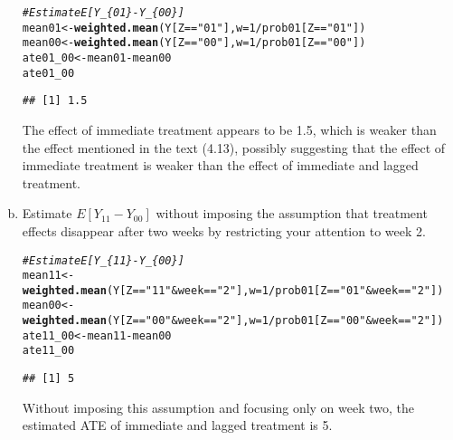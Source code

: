 \documentclass[11pt,notitlepage]{article}\usepackage[]{graphicx}\usepackage[]{color}
\makeatletter
\newcommand{\hlnum}[1]{\textcolor[rgb]{0.686,0.059,0.569}{#1}}%
\newcommand{\hlstr}[1]{\textcolor[rgb]{0.192,0.494,0.8}{#1}}%
\newcommand{\hlcom}[1]{\textcolor[rgb]{0.678,0.584,0.686}{\textit{#1}}}%
\newcommand{\hlopt}[1]{\textcolor[rgb]{0,0,0}{#1}}%
\newcommand{\hlstd}[1]{\textcolor[rgb]{0.345,0.345,0.345}{#1}}%
\newcommand{\hlkwb}[1]{\textcolor[rgb]{0.69,0.353,0.396}{#1}}%
\newcommand{\hlkwc}[1]{\textcolor[rgb]{0.333,0.667,0.333}{#1}}%
\newcommand{\hlkwd}[1]{\textcolor[rgb]{0.737,0.353,0.396}{\textbf{#1}}}%
\newenvironment{kframe}{%
 \def\at@end@of@kframe{}%
 \ifinner\ifhmode%
  \def\at@end@of@kframe{\end{minipage}}%
  \begin{minipage}{\columnwidth}%
 \fi\fi%
 \def\FrameCommand##1{\hskip\@totalleftmargin \hskip-\fboxsep
 \colorbox{shadecolor}{##1}\hskip-\fboxsep
     \hskip-\linewidth \hskip-\@totalleftmargin \hskip\columnwidth}%
 \MakeFramed {\advance\hsize-\width
   \@totalleftmargin\z@ \linewidth\hsize
   \@setminipage}}%
 {\par\unskip\endMakeFramed%
 \at@end@of@kframe}
\newenvironment{knitrout}{}{} %
\makeatother
\begin{document}
\begin{enumerate}[a)]
\begin{knitrout}
\begin{kframe}
\begin{alltt}
\hlcom{# Estimate E[Y_\{01\}-Y_\{00\}]}
\hlstd{mean01} \hlkwb{<-} \hlkwd{weighted.mean}\hlstd{(Y[Z}\hlopt{==}\hlstr{"01"}\hlstd{],} \hlkwc{w}\hlstd{=}\hlnum{1}\hlopt{/}\hlstd{prob01[Z}\hlopt{==}\hlstr{"01"}\hlstd{])}
\hlstd{mean00} \hlkwb{<-} \hlkwd{weighted.mean}\hlstd{(Y[Z}\hlopt{==}\hlstr{"00"}\hlstd{],} \hlkwc{w}\hlstd{=}\hlnum{1}\hlopt{/}\hlstd{prob01[Z}\hlopt{==}\hlstr{"00"}\hlstd{])}
\hlstd{ate01_00} \hlkwb{<-} \hlstd{mean01} \hlopt{-} \hlstd{mean00}
\hlstd{ate01_00}
\end{alltt}
\begin{verbatim}
## [1] 1.5
\end{verbatim}
\end{kframe}
\end{knitrout}
The effect of immediate treatment appears to be 1.5, which is weaker than the effect mentioned in the text (4.13), possibly suggesting that the effect of immediate treatment is weaker than the effect of immediate and lagged treatment.

\item Estimate $E[Y_{11} - Y_{00}]$ without imposing the assumption that treatment effects disappear after two weeks by restricting your attention to week 2.

\begin{knitrout}
\color{fgcolor}\begin{kframe}
\begin{alltt}
\hlcom{# Estimate E[Y_\{11\}-Y_\{00\}]}
\hlstd{mean11} \hlkwb{<-} \hlkwd{weighted.mean}\hlstd{(Y[Z}\hlopt{==}\hlstr{"11"} \hlopt{&} \hlstd{week}\hlopt{==}\hlstr{"2"}\hlstd{],} \hlkwc{w}\hlstd{=}\hlnum{1}\hlopt{/}\hlstd{prob01[Z}\hlopt{==}\hlstr{"01"} \hlopt{&} \hlstd{week}\hlopt{==}\hlstr{"2"}\hlstd{])}
\hlstd{mean00} \hlkwb{<-} \hlkwd{weighted.mean}\hlstd{(Y[Z}\hlopt{==}\hlstr{"00"} \hlopt{&} \hlstd{week}\hlopt{==}\hlstr{"2"}\hlstd{],} \hlkwc{w}\hlstd{=}\hlnum{1}\hlopt{/}\hlstd{prob01[Z}\hlopt{==}\hlstr{"00"} \hlopt{&} \hlstd{week}\hlopt{==}\hlstr{"2"}\hlstd{])}
\hlstd{ate11_00} \hlkwb{<-} \hlstd{mean11} \hlopt{-} \hlstd{mean00}
\hlstd{ate11_00}
\end{alltt}
\begin{verbatim}
## [1] 5
\end{verbatim}
\end{kframe}
\end{knitrout}

Without imposing this assumption and focusing only on week two, the estimated ATE of immediate and lagged treatment is 5.
\end{enumerate}
\end{document}
